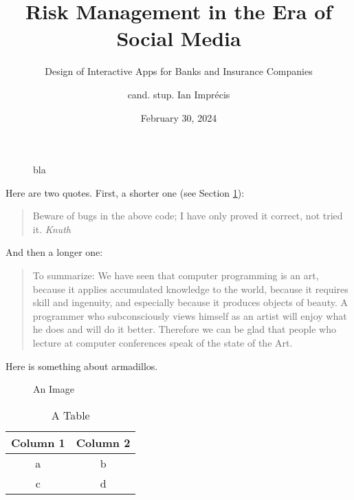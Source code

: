 \documentclass{scrreprt}
\begin{document}
	\titlehead{\Large University of Smartville}
	\subject{Master's Thesis}
	\title{Risk Management in the Era of Social Media}
	\subtitle{Design of Interactive Apps for Banks and
	Insurance Companies}
	\author{cand. stup. Ian Imprécis}
	\date{February 30, 2024}
	\publishers{Supervised by Prof. Dr. Smartypants}
	\dedication{For my Mom.}

	\maketitle

	\begin{abstract}
		\noindent\blindtext
	\end{abstract}

	\tableofcontents
	\listoffigures
	\listoftables

	\blinddocument

	\begin{figure}
		\caption{bla \label{fig:end}}
	\end{figure}

	Here are two quotes. First, a shorter one (see Section \cref{fig:end}):
	\begin{quote}
		Beware of bugs in the above code; I have only proved it correct, not tried it. \hfill\textit{Knuth}
	\end{quote}
	And then a longer one:
	\begin{quotation}
		To summarize: We have seen that computer programming is an art, because it applies accumulated knowledge to the world, because it requires skill and ingenuity, and especially because it produces objects of beauty. A programmer who subconsciously views himself as an artist will enjoy what he does and will do it better. Therefore we can be glad that people who lecture at computer conferences speak of the state of the Art. \cite{knuth74}
	\end{quotation}

	Here is something about armadillos. \cite{author88}  \blindtext[3]

	\begin{figure}
		\centering
		\caption{An Image}
		\label{fig:theimage}
	\end{figure}

	\begin{table}
		\centering
		\begin{tabular}{cc}
			\toprule
			Column 1 & Column 2\\
			\midrule
			a & b \\
			c & d\\
			\bottomrule
		\end{tabular}
		\caption{A Table}
		\label{tab:thetable}
	\end{table}
\end{document}
